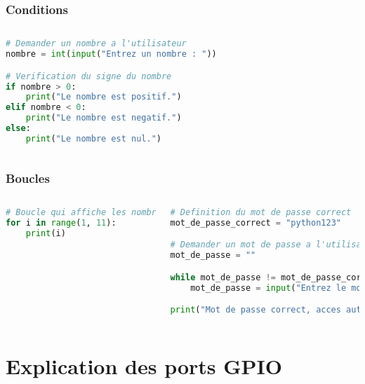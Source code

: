 \documentclass[aspectratio=169,xcolor=dvipsnames]{beamer}
\begin{document}
\begin{frame}[fragile]
\frametitle{Conditions}
    \begin{columns}[c] %

        \begin{lstlisting}[language=Python]
# Demander un nombre a l'utilisateur
nombre = int(input("Entrez un nombre : "))

# Verification du signe du nombre
if nombre > 0:
    print("Le nombre est positif.")
elif nombre < 0:
    print("Le nombre est negatif.")
else:
    print("Le nombre est nul.")
        \end{lstlisting}

    \end{columns}
\end{frame}

\begin{frame}[fragile]
\frametitle{Boucles}
    \begin{columns}[c] %

        \begin{lstlisting}[language=Python]
# Boucle qui affiche les nombres de 1 a 10
for i in range(1, 11):
    print(i)
        \end{lstlisting}
        \vspace{5mm}
        \begin{lstlisting}[language=Python]
# Definition du mot de passe correct
mot_de_passe_correct = "python123"

# Demander un mot de passe a l'utilisateur
mot_de_passe = ""

while mot_de_passe != mot_de_passe_correct:
    mot_de_passe = input("Entrez le mot de passe : ")

print("Mot de passe correct, acces autorise !")
        \end{lstlisting}

    \end{columns}
\end{frame}


\section{Explication des ports GPIO}
\end{document}
